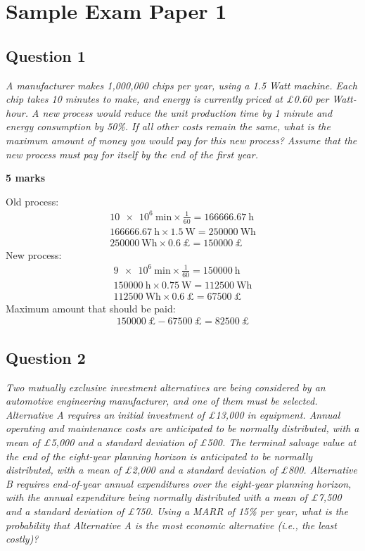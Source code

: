 \chapter{Sample Exam Paper 1}
\section{Question 1}
\textit{A manufacturer makes 1,000,000 chips per year, using a 1.5 Watt machine. Each chip takes 10 minutes to make, and energy is currently priced at \pounds 0.60 per Watt-hour. A new process would reduce the unit production time by 1 minute and energy consumption by 50\%. If all other costs remain the same, what is the maximum amount of money you would pay for this new process? Assume that the new process must pay for itself by the end of the first year.}

\textbf{5 marks}

Old process:
\begin{gather}
    \SI{10e6}{\minute}\times \frac{1}{60} = \SI{166666.67}{\hour}\\
    \SI{166666.67}{\hour} \times \SI{1.5}{\watt} = \SI{250000}{\watt\hour}\\
    \SI{250000}{\watt\hour} \times \SI{0.6}{\pounds} = \SI{150000}{\pounds}
\end{gather}
New process:
\begin{gather}
    \SI{9e6}{\minute}\times \frac{1}{60} = \SI{150000}{\hour}\\
    \SI{150000}{\hour} \times \SI{0.75}{\watt} = \SI{112500}{\watt\hour}\\
    \SI{112500}{\watt\hour} \times \SI{0.6}{\pounds} = \SI{67500}{\pounds}
\end{gather}
Maximum amount that should be paid:
\begin{gather}
    \SI{150000}{\pounds} - \SI{67500}{\pounds} = \SI{82500}{\pounds}
\end{gather}
\section{Question 2}
\textit{Two mutually exclusive investment alternatives are being considered by an automotive engineering manufacturer, and one of them must be selected. Alternative A requires an initial investment of \pounds 13,000 in equipment. Annual operating and maintenance costs are anticipated to be normally distributed, with a mean of \pounds 5,000 and a standard deviation of \pounds 500. The terminal salvage value at the end of the eight-year planning horizon is anticipated to be normally distributed, with a mean of \pounds 2,000 and a standard deviation of \pounds 800. Alternative B requires end-of-year annual expenditures over the eight-year planning horizon, with the annual expenditure being normally distributed with a mean of \pounds 7,500 and a standard deviation of \pounds 750. Using a MARR of 15\% per year, what is the probability that Alternative A is the most economic alternative (i.e., the least costly)?}

